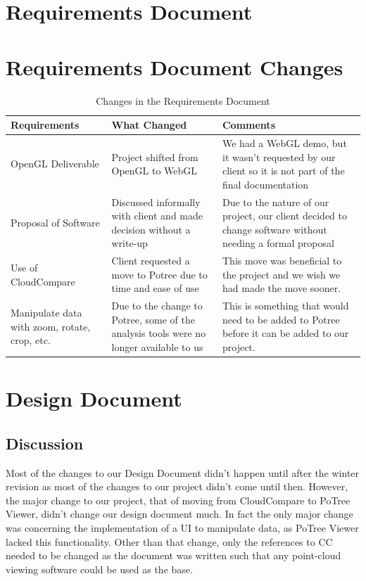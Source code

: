 \documentclass[draftclsnofoot,onecolumn]{IEEEtran}
\begin{document}
\clearpage
\section{Requirements Document}



\section{Requirements Document Changes}

\begin{table}[ht]
\caption{Changes in the Requirements Document}
\centering
\begin{tabular}{l l l}
\hline
\hline
    Requirements & What Changed & Comments \\
    \hline
    OpenGL Deliverable & Project shifted from OpenGL to WebGL & We had a WebGL demo, but it wasn't requested by our client so it is not part of the final documentation \\
    Proposal of Software & Discussed informally with client and made decision without a write-up & Due to the nature of our project, our client decided to change software without needing a formal proposal\\
    Use of CloudCompare & Client requested a move to Potree due to time and ease of use & This move was beneficial to the project and we wish we had made the move sooner.\\
    Manipulate data with zoom, rotate, crop, etc. & Due to the change to Potree, some of the analysis tools were no longer available to us & This is something that would need to be added to Potree before it can be added to our project.
    
\end{tabular}
\end{table}


\section{Design Document}



\subsection{Discussion}

Most of the changes to our Design Document didn't happen until after the winter revision as most of the changes to our project didn't come until then.
However, the major change to our project, that of moving from CloudCompare to PoTree Viewer, didn't change our design document much.
In fact the only major change was concerning the implementation of a UI to manipulate data, as PoTree Viewer lacked this functionality.
Other than that change, only the references to CC needed to be changed as the document was written such that any point-cloud viewing software could be used as the base.
\end{document}
